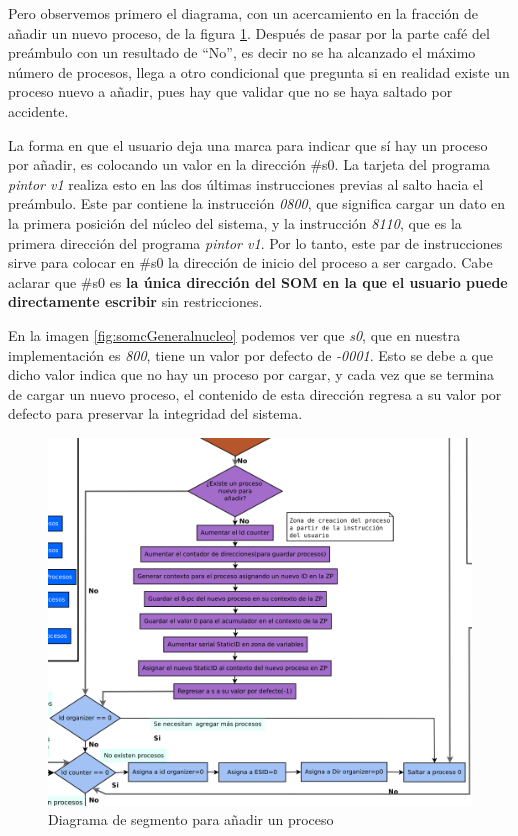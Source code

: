 \documentclass[letterpaper,12pt,oneside]{book}
\begin{document}
            Pero observemos
			primero el diagrama, con un acercamiento en la fracción de añadir un nuevo proceso, de la figura \ref{fig:diagAddnewprocess}. Después
			de pasar por la parte café del preámbulo con un resultado de ``No'', es decir no se ha alcanzado el máximo número de procesos,
			llega a otro condicional que pregunta si en realidad existe un proceso nuevo a añadir, pues hay que validar que no se haya saltado por
			accidente.
			
			La forma  en que el usuario deja una marca para indicar que sí hay un proceso por añadir, es colocando un valor
			en la dirección \#s0. La tarjeta del programa \textit{pintor v1} realiza esto en las dos últimas instrucciones previas
			al salto hacia el preámbulo. Este par contiene la instrucción \textit{0800}, que significa cargar un dato en la primera posición del núcleo 
			del sistema,
			y la instrucción \textit{8110}, que es la primera dirección del programa \textit{pintor v1}. Por lo tanto, este par de instrucciones
			sirve para colocar en \#s0 la dirección de inicio del proceso a ser cargado. Cabe aclarar que \#s0
			es \textbf{la única
			dirección del SOM en la que el usuario puede directamente escribir} sin restricciones.
   
            En la imagen \ref{fig:somcGeneralnucleo}
			podemos ver que \textit{s0}, que en nuestra implementación es \textit{800}, tiene un valor por defecto de \textit{-0001}. Esto se debe a que 
			dicho valor indica que no hay un proceso por cargar, y cada vez que se termina de cargar un nuevo proceso, el contenido de esta dirección 
			regresa a su valor por defecto para preservar la integridad del sistema.
			

		\begin{figure}[h]		
			\centering
			\includegraphics[scale=0.4]{media/CARDIACC/DiagAddNewProcces.png}
			\caption{Diagrama de segmento para añadir un proceso}
			\label{fig:diagAddnewprocess}
		\end{figure}
\end{document}
